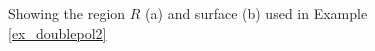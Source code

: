 \begin{example}
\begin{figure}[H]
\centering
\qquad
{}
\caption{Showing the region $R$ (a) and surface (b) used in Example \ref{ex_doublepol2}}
\end{figure}

\end{example}


%



